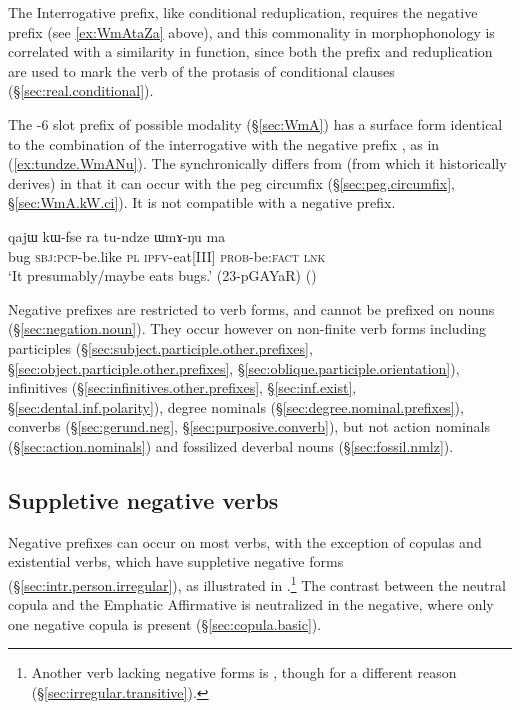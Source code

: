 The Interrogative  prefix, like conditional reduplication, requires the  negative prefix (see \ref{ex:WmAtaZa} above), and this commonality in morphophonology is correlated with a similarity in function, since both the prefix  and reduplication are used to mark the verb of the protasis of conditional clauses (§\ref{sec:real.conditional}).


The -6 slot  prefix of possible modality (§\ref{sec:WmA}) has a surface form identical to the combination of the interrogative  with the negative prefix , as in (\ref{ex:tundze.WmANu}). The  synchronically differs from  (from which it historically derives) in that it can occur with the peg circumfix (§\ref{sec:peg.circumfix}, §\ref{sec:WmA.kW.ci}). It is not compatible with a negative prefix.

\begin{exe}
	\ex \label{ex:tundze.WmANu}
	\gll  qajɯ kɯ-fse ra tu-ndze ɯmɤ-ŋu ma \\
	bug \textsc{sbj}:\textsc{pcp}-be.like \textsc{pl} \textsc{ipfv}-eat[III] \textsc{prob}-be:\textsc{fact} \textsc{lnk} \\
	\glt `It presumably/maybe eats bugs.' (23-pGAYaR) ()
\end{exe}

Negative prefixes are restricted to verb forms, and cannot be prefixed on nouns (§\ref{sec:negation.noun}).  They occur however on non-finite verb forms including participles (§\ref{sec:subject.participle.other.prefixes}, §\ref{sec:object.participle.other.prefixes}, §\ref{sec:oblique.participle.orientation}), infinitives (§\ref{sec:infinitives.other.prefixes}, §\ref{sec:inf.exist}, §\ref{sec:dental.inf.polarity}), degree nominals (§\ref{sec:degree.nominal.prefixes}), converbs (§\ref{sec:gerund.neg}, §\ref{sec:purposive.converb}), but not action nominals (§\ref{sec:action.nominals}) and  fossilized deverbal nouns (§\ref{sec:fossil.nmlz}).

\subsection{Suppletive negative verbs} \label{sec:suppletive.negative}
Negative prefixes can occur on most verbs, with the exception of copulas and existential verbs, which have suppletive negative forms (§\ref{sec:intr.person.irregular}), as illustrated in .\footnote{Another verb lacking negative forms is  , though for a different reason (§\ref{sec:irregular.transitive}). } The contrast between the neutral copula  and the Emphatic Affirmative  is neutralized in the negative, where only one negative copula  is present (§\ref{sec:copula.basic}).


